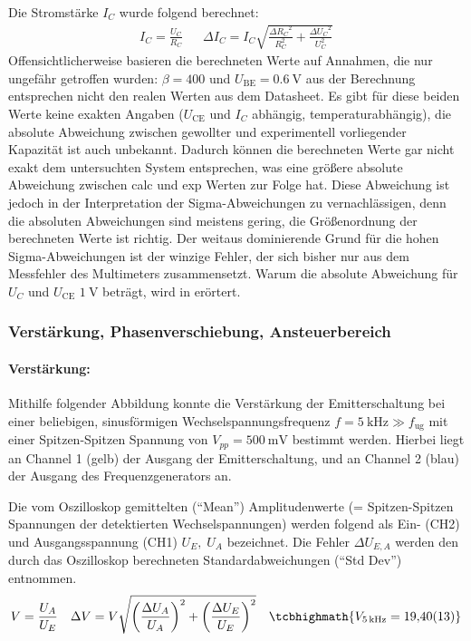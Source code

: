 Die Stromstärke \(I_C\) wurde folgend berechnet:
\begin{align}
  I_C=\frac{U_C}{R_C}&&\Delta I_C=I_C\sqrt{\frac{\Delta{R_C}^{2}}{R_C^{2}} + \frac{\Delta{U_C}^{2}}{U_C^{2}}}
  \label{eq:Stromstärke_fehler}
\end{align}
Offensichtlicherweise basieren die berechneten Werte auf Annahmen, die nur ungefähr getroffen wurden: \(\beta=400\) und \(U_{\text{BE}}=\qty{0.6}{\volt}\) aus der Berechnung entsprechen nicht den realen Werten aus dem Datasheet. Es gibt für diese beiden Werte keine exakten Angaben (\(U_{\text{CE}}\) und \(I_C\) abhängig, temperaturabhängig), die absolute Abweichung zwischen gewollter und experimentell vorliegender Kapazität ist auch unbekannt. Dadurch können die berechneten Werte gar nicht exakt dem untersuchten System entsprechen, was eine größere absolute Abweichung zwischen calc und exp Werten zur Folge hat. Diese Abweichung ist jedoch in der Interpretation der Sigma-Abweichungen zu vernachlässigen, denn die absoluten Abweichungen sind meistens gering, die Größenordnung der berechneten Werte ist richtig. Der weitaus dominierende Grund für die hohen Sigma-Abweichungen ist der winzige Fehler, der sich bisher nur aus dem Messfehler des Multimeters zusammensetzt. Warum die absolute Abweichung für \(U_C\) und \(U_{\text{CE}}\) \(\qty{1}{\volt}\) beträgt, wird in  erörtert. 

\subsubsection{Verstärkung, Phasenverschiebung, Ansteuerbereich} 
\paragraph{Verstärkung:} Mithilfe folgender Abbildung konnte die Verstärkung der Emitterschaltung bei einer beliebigen, sinusförmigen Wechselspannungsfrequenz \(f =\qty{5}{\kilo\hertz}\gg f_{\text{ug}}\) mit einer Spitzen-Spitzen Spannung von \(V_{pp}=\qty{500}{\milli\volt}\) bestimmt werden. Hierbei liegt an Channel 1 (gelb) der Ausgang der Emitterschaltung, und an Channel 2 (blau) der Ausgang des Frequenzgenerators an. 
\FloatBarrier

Die vom Oszilloskop gemittelten (\enquote{Mean}) Amplitudenwerte (= Spitzen-Spitzen Spannungen der detektierten Wechselspannungen) werden folgend als Ein- (CH2) und Ausgangsspannung (CH1) \(U_E,\;U_A\) bezeichnet. Die Fehler \(\Delta U_{E,A}\) werden den durch das Oszilloskop berechneten Standardabweichungen (\enquote{Std Dev}) entnommen.
\begin{align}
  V=\frac{U_A}{U_E}&&\Delta V=V\sqrt{\left(\frac{\Delta U_A}{U_A}\right)^2+\left(\frac{\Delta U_E}{U_E}\right)^2}&&\tcbhighmath{V_{\qty{5}{\kilo\hertz}}=\num{19.40(0.13)}}
\end{align}
